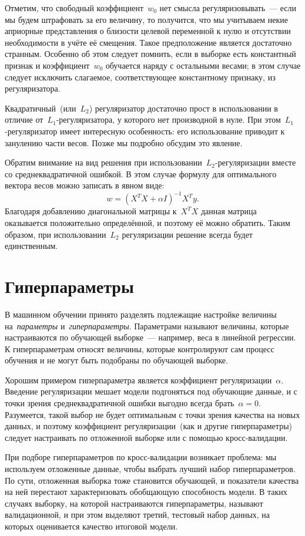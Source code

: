 \documentclass[12pt,fleqn]{article}
\begin{document}
Отметим, что свободный коэффициент~$w_0$ нет смысла регуляризовывать~---
если мы будем штрафовать за его величину, то получится, что
мы учитываем некие априорные представления о близости целевой переменной к нулю
и отсутствии необходимости в учёте её смещения.
Такое предположение является достаточно странным.
Особенно об этом следует помнить, если в выборке есть константный признак
и коэффициент~$w_0$ обучается наряду с остальными весами;
в этом случае следует исключить слагаемое, соответствующее константному признаку, из регуляризатора.

Квадратичный~(или~$L_2$) регуляризатор достаточно прост в использовании
в отличие от~$L_1$-регуляризатора, у которого нет производной в нуле.
При этом~$L_1$-регуляризатор имеет интересную особенность:
его использование приводит к занулению части весов.
Позже мы подробно обсудим это явление.

Обратим внимание на вид решения при использовании~$L_2$-регуляризации вместе со среднеквадратичной ошибкой.
В этом случае формулу для оптимального вектора весов можно записать в явном виде:
\[
    w
    =
    (X^T X + \alpha I)^{-1} X^T y.
\]
Благодаря добавлению диагональной матрицы к~$X^T X$ данная матрица
оказывается положительно определённой, и поэтому её можно обратить.
Таким образом, при использовании~$L_2$ регуляризации решение всегда будет единственным.

\section{Гиперпараметры}

В машинном обучении принято разделять подлежащие настройке величины
на~\emph{параметры} и~\emph{гиперпараметры}.
Параметрами называют величины, которые настраиваются по обучающей выборке~--- например,
веса в линейной регрессии.
К гиперпараметрам относят величины, которые контролируют сам процесс обучения и
не могут быть подобраны по обучающей выборке.

Хорошим примером гиперпараметра является коэффициент регуляризации~$\alpha$.
Введение регуляризации мешает модели подгоняться под обучающие данные,
и с точки зрения среднеквадратичной ошибки выгодно всегда брать~$\alpha = 0$.
Разумеется, такой выбор не будет оптимальным с точки зрения качества на новых данных,
и поэтому коэффициент регуляризации~(как и другие гиперпараметры) следует
настраивать по отложенной выборке или с помощью кросс-валидации.

При подборе гиперпараметров по кросс-валидации возникает проблема:
мы используем отложенные данные, чтобы выбрать лучший набор гиперпараметров.
По сути, отложенная выборка тоже становится обучающей, и показатели качества на ней
перестают характеризовать обобщающую способность модели.
В таких случаях выборку, на которой настраиваются гиперпараметры,
называют валидационной, и при этом выделяют третий, тестовый набор данных,
на которых оценивается качество итоговой модели.
\end{document}
